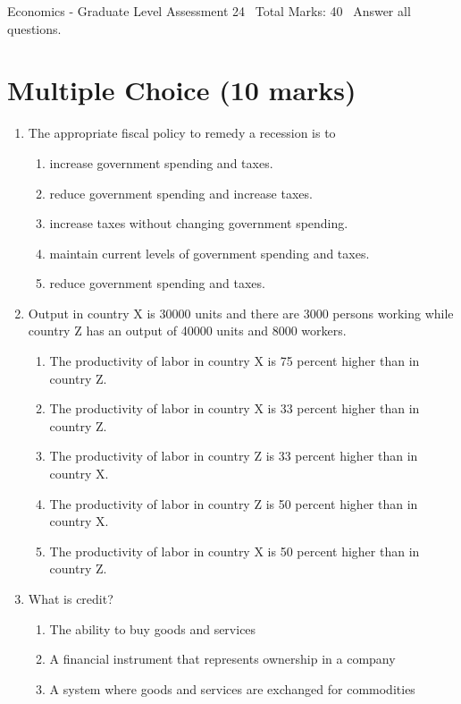 \documentclass[12pt]{article}
\begin{document}
\begin{center}
Economics - Graduate Level Assessment 24 \
Total Marks: 40 \
Answer all questions.
\end{center}

\section*{Multiple Choice (10 marks)}
\begin{enumerate}[label=\arabic*.]
\item The appropriate fiscal policy to remedy a recession is to
\begin{enumerate}[label=(\alph*)]
    \item increase government spending and taxes.
    \item reduce government spending and increase taxes.
    \item increase taxes without changing government spending.
    \item maintain current levels of government spending and taxes.
    \item reduce government spending and taxes.
\end{enumerate}
\item Output in country X is 30000 units and there are 3000 persons working while country Z has an output of 40000 units and 8000 workers.
\begin{enumerate}[label=(\alph*)]
    \item The productivity of labor in country X is 75 percent higher than in country Z.
    \item The productivity of labor in country X is 33 percent higher than in country Z.
    \item The productivity of labor in country Z is 33 percent higher than in country X.
    \item The productivity of labor in country Z is 50 percent higher than in country X.
    \item The productivity of labor in country X is 50 percent higher than in country Z.
\end{enumerate}
\item What is credit?
\begin{enumerate}[label=(\alph*)]
    \item The ability to buy goods and services
    \item A financial instrument that represents ownership in a company
    \item A system where goods and services are exchanged for commodities

\end{enumerate}
\end{enumerate}
\end{document}
